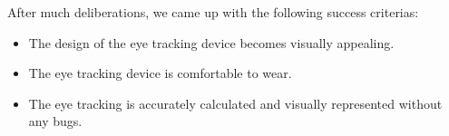 After much deliberations, we came up with the following success criterias:
\begin {itemize}
\item The design of the eye tracking device becomes visually appealing.
\item The eye tracking device is comfortable to wear.
\item The eye tracking is accurately calculated and visually represented without any bugs.
\end {itemize}